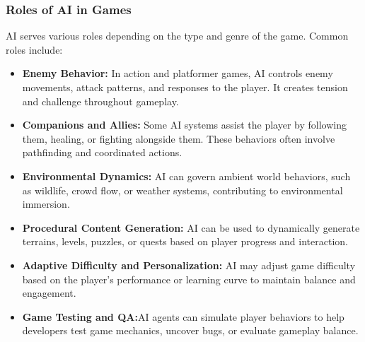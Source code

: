 \documentclass[12pt,oneside,openright,a4paper]{cpe-english-project}
\begin{document}
\subsubsection{Roles of AI in Games}
AI serves various roles depending on the type and genre of the game. Common roles include:
\begin{itemize}
\item \textbf{Enemy Behavior:} In action and platformer games, AI controls enemy movements, attack patterns, and responses to the player. It creates tension and challenge throughout gameplay.
\item \textbf{Companions and Allies:} Some AI systems assist the player by following them, healing, or fighting alongside them. These behaviors often involve pathfinding and coordinated actions.
\item \textbf{Environmental Dynamics:} AI can govern ambient world behaviors, such as wildlife, crowd flow, or weather systems, contributing to environmental immersion.
\item \textbf{Procedural Content Generation:} AI can be used to dynamically generate terrains, levels, puzzles, or quests based on player progress and interaction.
\item \textbf{Adaptive Difficulty and Personalization:} AI may adjust game difficulty based on the player’s performance or learning curve to maintain balance and engagement.
\item  \textbf{Game Testing and QA:}AI agents can simulate player behaviors to help developers test game mechanics, uncover bugs, or evaluate gameplay balance.
\end{itemize}
\end{document}
